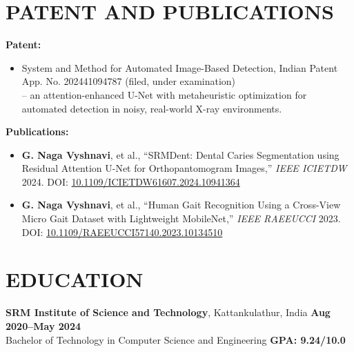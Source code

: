 \documentclass[a4paper,10pt]{article}
\begin{document}
\section{\textbf{PATENT AND PUBLICATIONS}}
\vspace{0pt}
\noindent\textbf{Patent:}\\
\begin{itemize}
    \vspace{-15pt}
    \item System and Method for Automated Image-Based Detection, Indian Patent App. No. 202441094787 (filed, under examination) \\ -- an attention-enhanced U-Net with metaheuristic optimization for automated detection in noisy, real-world X-ray environments. \vspace{-11pt}
\end{itemize}
\noindent\textbf{Publications:}\\
\begin{itemize}
    \vspace{-15pt}
    \item \textbf{G. Naga Vyshnavi}, et al., ``SRMDent: Dental Caries Segmentation using Residual Attention U-Net for Orthopantomogram Images,'' \textit{IEEE ICIETDW} 2024. DOI: \href{https://doi.org/10.1109/ICIETDW61607.2024.10941364}{10.1109/ICIETDW61607.2024.10941364} \vspace{-7pt}
    \item \textbf{G. Naga Vyshnavi}, et al., ``Human Gait Recognition Using a Cross-View Micro Gait Dataset with Lightweight MobileNet,'' \textit{IEEE RAEEUCCI} 2023. DOI: \href{https://doi.org/10.1109/RAEEUCCI57140.2023.10134510}{10.1109/RAEEUCCI57140.2023.10134510} \vspace{-7pt}
\end{itemize}

\vspace{-1pt}

\section{\textbf{EDUCATION}}
\vspace{0pt}

\noindent\textbf{SRM Institute of Science and Technology}, Kattankulathur, India \hfill \textbf{Aug 2020--May 2024} \\
Bachelor of Technology in Computer Science and Engineering \hfill \textbf{GPA: 9.24/10.0} \\
\end{document}
